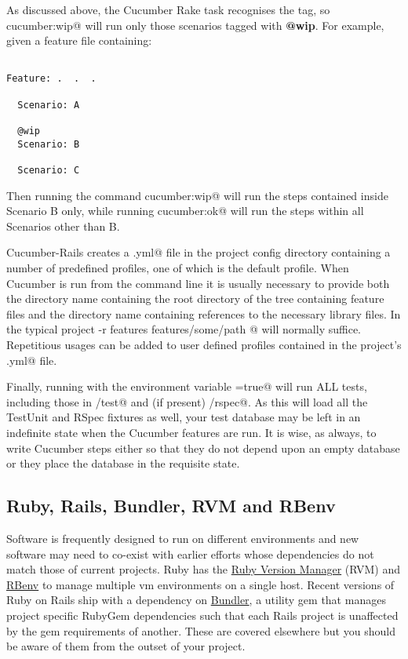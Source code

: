 \documentclass[10pt]{book}
\begin{document}
As discussed above, the Cucumber Rake task recognises the \verb@@wip@ tag, so \verb@rake cucumber:wip@ will run only those scenarios tagged with \textbf{@wip}.  For example, given a feature file containing:

\begin{verbatim}

Feature: .  .  .

  Scenario: A

  @wip
  Scenario: B

  Scenario: C

\end{verbatim}
Then running the command \verb@rake cucumber:wip@ will run the steps contained inside Scenario B only, while running \verb@rake cucumber:ok@ will run the steps within all Scenarios other than B.

Cucumber-Rails creates a \verb@cucumber.yml@ file in the project config directory containing a number of predefined profiles, one of which is the default profile.  When Cucumber is run from the command line it is usually necessary to provide both the directory name containing the root directory of the tree containing feature files and the directory name containing references to the necessary library files.  In the typical project \verb@cucumber -r features features/some/path @ will normally suffice.  Repetitious usages can be added to user defined profiles contained in the project's \verb@cucumber.yml@ file.

Finally, running \verb@autotest@ with the environment variable \verb@AUTOFEATURE=true@ will run ALL tests, including those in \verb@/test@ and (if present) \verb@/rspec@.  As this will load all the TestUnit and RSpec fixtures as well, your test database may be left in an indefinite state when the Cucumber features are run.  It is wise, as always, to write Cucumber steps either so that they do not depend upon an empty database or they place the database in the requisite state.

\subsection{Ruby, Rails, Bundler, RVM and RBenv}

Software is frequently designed to run on different environments and new software may need to co-exist with earlier efforts whose dependencies do not match those of current projects. Ruby has the \href{http://rvm.io/}{Ruby Version Manager} (RVM) and \href{https://github.com/sstephenson/rbenv.git}{RBenv} to manage multiple vm environments on a single host.  Recent versions of Ruby on Rails ship with a dependency on \href{http://gembundler.com/}{Bundler}, a utility gem that manages project specific RubyGem dependencies such that each Rails project is unaffected by the gem requirements of another.  These are covered elsewhere but you should be aware of them from the outset of your project.
\end{document}

